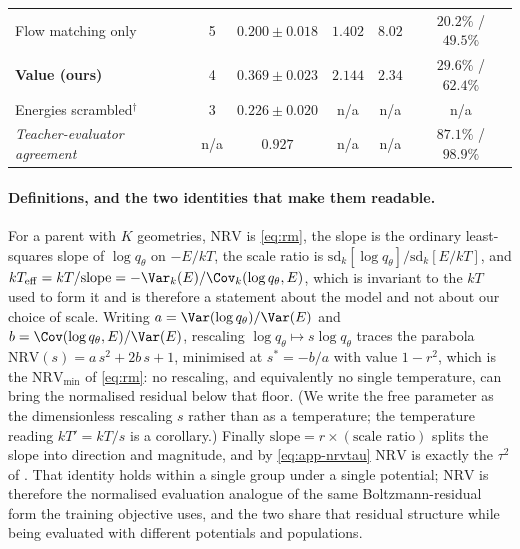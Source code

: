 \begin{table}[h]
\begin{center}
\begin{tabular}{lccccc}
\midrule
Flow matching only          & 5 & $0.200 \pm 0.018$ & $1.402$ & $8.02$ & $20.2\%$ / $49.5\%$ \\
\textbf{Value (ours)}       & 4 & $\mathbf{0.369 \pm 0.023}$ & $2.144$ & $2.34$ & $\mathbf{29.6\%}$ / $\mathbf{62.4\%}$ \\
Energies scrambled$^{\dagger}$ & 3 & $0.226 \pm 0.020$ & n/a & n/a & n/a \\
\midrule
\emph{Teacher-evaluator agreement} & n/a & $0.927$ & n/a & n/a & $87.1\%$ / $98.9\%$ \\
\bottomrule
\end{tabular}
\end{center}
\end{table}

\paragraph{Definitions, and the two identities that make them readable.} For a
parent with $K$ geometries, $\mathrm{NRV}$ is \eqref{eq:rm}, the slope is the
ordinary least-squares slope of $\log q_\theta$ on $-E/kT$, the scale ratio is
$\mathrm{sd}_k[\log q_\theta]/\mathrm{sd}_k[E/kT]$, and
$kT_{\mathrm{eff}} = kT/\mathrm{slope} = -\Var_k(E)/\Cov_k(\log q_\theta, E)$,
which is invariant to the $kT$ used to form it and is therefore a statement about
the model and not about our choice of scale. Writing
$a = \Var(\log q_\theta)/\Var(E)$ and $b = \Cov(\log q_\theta,E)/\Var(E)$, rescaling
$\log q_\theta \mapsto s\log q_\theta$ traces the parabola
$\mathrm{NRV}(s) = a\,s^2 + 2b\,s + 1$, minimised at $s^{*} = -b/a$ with value
$1-r^2$, which is the $\mathrm{NRV}_{\min}$ of \eqref{eq:rm}: no rescaling, and
equivalently no single temperature, can bring the normalised residual below that
floor. (We write the free parameter as the dimensionless rescaling $s$ rather than
as a temperature; the temperature reading $kT' = kT/s$ is a corollary.) Finally
$\mathrm{slope} = r \times (\text{scale ratio})$ splits the slope into direction and
magnitude, and by \eqref{eq:app-nrvtau} $\mathrm{NRV}$ is exactly the $\tau^2$ of
. That identity holds within a single group under a single
potential; $\mathrm{NRV}$ is therefore the normalised evaluation analogue of the same
Boltzmann-residual form the training objective uses, and the two share that residual
structure while being evaluated with different potentials and populations.


